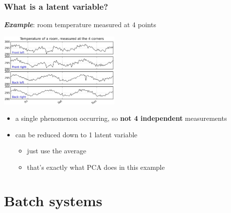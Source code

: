 \documentclass[handout, 12pt]{beamer}
\begin{document}
\begin{frame}\frametitle{What is a latent variable?}

	\textbf{\emph{Example}}: room temperature measured at 4 points
	
	\begin{center}
		\includegraphics[width=6cm]{images/room-temperature-plots.jpg}
	\end{center}
	
	\begin{itemize}
		\item	a single phenomenon occurring, so \textbf{not 4 independent}  measurements
		
		\item	can be reduced down to 1 latent variable
		
				\begin{itemize}
					\item	just use the average
					
					\item	that's exactly what PCA does in this example
				\end{itemize}
		
	\end{itemize}
	
	

\end{frame}

\section{Batch systems}
\end{document}
